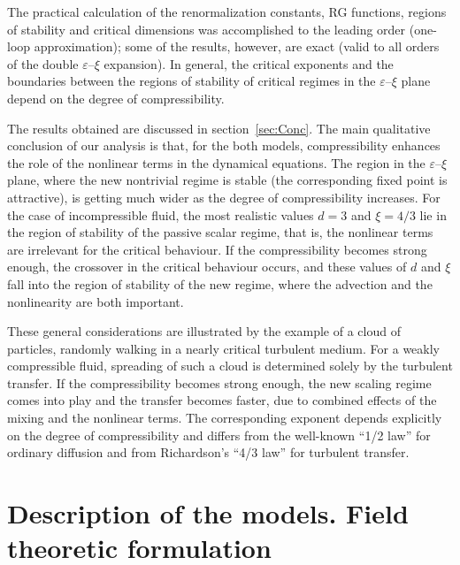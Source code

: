 \documentclass[12pt]{article}
\begin{document}
The practical calculation of the renormalization constants, RG functions,
regions of stability and critical dimensions was accomplished to the
leading order (one-loop approximation); some of the results, however, are
exact (valid to all orders of the double $\varepsilon$--$\xi$ expansion).
In general, the critical exponents and the boundaries
between the regions of stability of critical regimes in the
$\varepsilon$--$\xi$ plane depend on the degree of compressibility.

The results obtained are discussed in section~\ref{sec:Conc}.
The main qualitative conclusion of our analysis is that, for the both
models, compressibility enhances the role of the nonlinear terms in the
dynamical equations. The region in the $\varepsilon$--$\xi$ plane, where
the new nontrivial regime is stable (the corresponding fixed point is
attractive), is getting much wider as the degree of compressibility
increases. For the case of incompressible fluid, the most realistic values
$d=3$ and $\xi=4/3$ lie in the region of stability of the passive scalar
regime, that is, the nonlinear terms are irrelevant for the critical
behaviour. If the compressibility becomes strong enough, the crossover
in the critical behaviour occurs, and these values of $d$ and $\xi$
fall into the region of stability of the new regime, where the advection
and the nonlinearity are both important.

These general considerations are illustrated by the example of a cloud
of particles, randomly walking in a nearly critical turbulent medium.
For a weakly compressible fluid, spreading of such a cloud is
determined solely by the turbulent transfer. If the compressibility becomes
strong enough, the new scaling regime comes into play and the transfer
becomes faster, due to combined effects of the mixing and the nonlinear
terms. The corresponding exponent depends explicitly on the degree of
compressibility and differs from the well-known ``1/2 law'' for ordinary
diffusion and from Richardson's ``4/3 law'' for turbulent transfer.


\section{Description of the models. Field theoretic formulation}
\label{sec:QFT}
\end{document}
